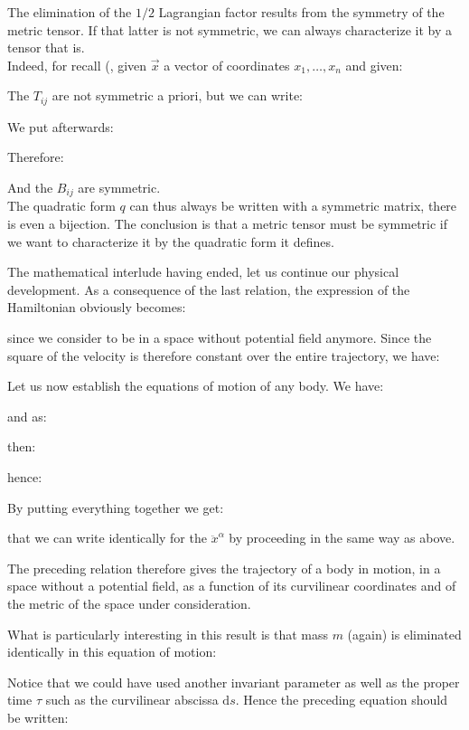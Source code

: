 	\begin{tcolorbox}[title=Remark,colframe=black,arc=10pt]
	The elimination of the $1/2$ Lagrangian factor results from the symmetry of the metric tensor. If that latter is not symmetric, we can always characterize it by a tensor that is.\\

	Indeed, for recall (, given $\vec{x}$ a vector of coordinates $x_1,\ldots,x_n$ and given:
	
	The $T_{ij}$ are not symmetric a priori, but we can write:
	
	We put afterwards:
	
	Therefore:
	
	And the $B_{ij}$ are symmetric.\\
	
	The quadratic form $q$ can thus always be written with a symmetric matrix, there is even a bijection. The conclusion is that a metric tensor must be symmetric if we want to characterize it by the quadratic form it defines.
	\end{tcolorbox}
	The mathematical interlude having ended, let us continue our physical development. As a consequence of the last relation, the expression of the Hamiltonian obviously becomes:
	
	since we consider to be in a space without potential field anymore. Since the square of the velocity is therefore constant over the entire trajectory, we have:
	
	Let us now establish the equations of motion of any body. We have:
	
	and as:
	
	then:
	
	hence:
	
	By putting everything together we get:
	
	that we can write identically for the $\ddot{x}^\alpha$ by proceeding in the same way as above.

	The preceding relation therefore gives the trajectory of a body in motion, in a space without a potential field, as a function of its curvilinear coordinates and of the metric of the space under consideration.

	What is particularly interesting in this result is that mass $m$ (again) is eliminated identically in this equation of motion:
	
	Notice that we could have used another invariant parameter as well as the proper time $\tau$ such as the curvilinear abscissa $\mathrm{d}s$. Hence the preceding equation should be written:
	
